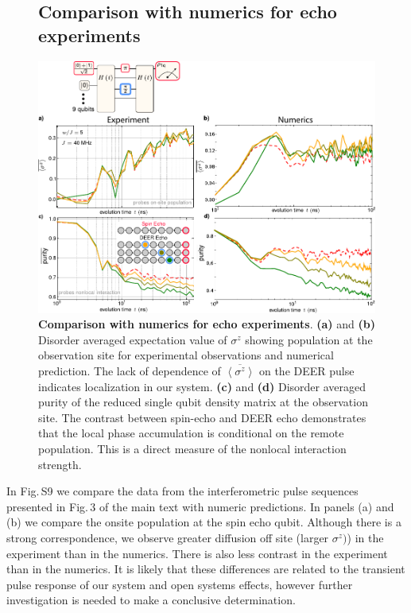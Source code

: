 \begin{figure}
\subsection{Comparison with numerics for echo experiments}
\centering
\includegraphics[width=140mm, keepaspectratio]{./PDF/echo_numerics_comparison_190919_944a.pdf}
\caption{\textbf{Comparison with numerics for echo experiments}.
\textbf{(a)} and \textbf{(b)} Disorder averaged expectation value of $\sigma^z$ showing population at the observation site for experimental observations and numerical prediction.
The lack of dependence of $\overline{ \left< \sigma^z \right> }$ on the DEER pulse indicates localization in our system.
\textbf{(c)} and \textbf{(d)} Disorder averaged purity of the reduced single qubit density matrix at the observation site.
The contrast between spin-echo and DEER echo demonstrates that the local phase accumulation is conditional on the remote population.
This is a direct measure of the nonlocal interaction strength.}
\end{figure}

In Fig.\,S9 we compare the data from the interferometric pulse sequences presented in Fig.\,3 of the main text with numeric predictions.  In panels (a) and (b) we compare the onsite population at the spin echo qubit.  Although there is a strong correspondence, we observe greater diffusion off site (larger $\sigma^z)$)  in the experiment than in the numerics.  There is also less contrast in the experiment than in the numerics.  It is likely that these differences are related to the transient pulse response of our system and open systems effects, however further investigation is needed to make a conclusive determination.

